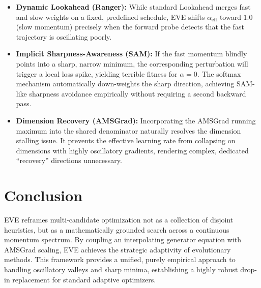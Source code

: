 \documentclass[12pt]{article}
\begin{document}
\begin{itemize}
    \item \textbf{Dynamic Lookahead (Ranger):} While standard Lookahead merges fast and slow weights on a fixed, predefined schedule, EVE shifts $\alpha_{\mathrm{eff}}$ toward $1.0$ (slow momentum) precisely when the forward probe detects that the fast trajectory is oscillating poorly.
    \item \textbf{Implicit Sharpness-Awareness (SAM):} If the fast momentum blindly points into a sharp, narrow minimum, the corresponding perturbation will trigger a local loss spike, yielding terrible fitness for $\alpha=0$. The softmax mechanism automatically down-weights the sharp direction, achieving SAM-like sharpness avoidance empirically without requiring a second backward pass.
    \item \textbf{Dimension Recovery (AMSGrad):} Incorporating the AMSGrad running maximum into the shared denominator naturally resolves the dimension stalling issue. It prevents the effective learning rate from collapsing on dimensions with highly oscillatory gradients, rendering complex, dedicated ``recovery'' directions unnecessary.
\end{itemize}

\section{Conclusion}
\label{sec:conclusion}

EVE reframes multi-candidate optimization not as a collection of disjoint heuristics, but as a mathematically grounded search across a continuous momentum spectrum. By coupling an interpolating generator equation with AMSGrad scaling, EVE achieves the strategic adaptivity of evolutionary methods. This framework provides a unified, purely empirical approach to handling oscillatory valleys and sharp minima, establishing a highly robust drop-in replacement for standard adaptive optimizers.
\end{document}
